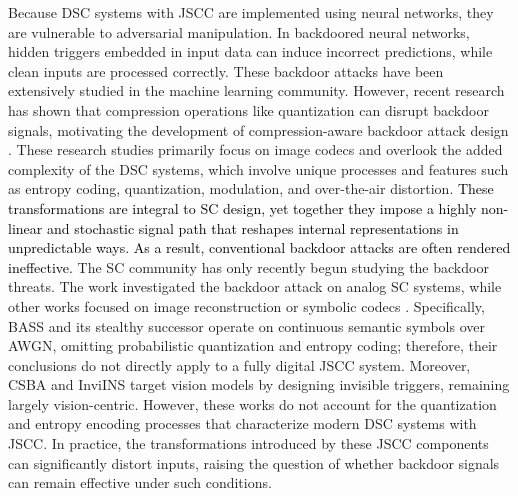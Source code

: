 \documentclass[journal]{IEEEtran}
\begin{document}
Because DSC systems with JSCC are implemented using neural networks, they are vulnerable to adversarial manipulation. 
In backdoored neural networks, hidden triggers embedded in input data can 
induce
incorrect predictions, while clean inputs are processed correctly.
These backdoor attacks have been extensively studied in the machine learning community. However, recent research has shown that compression operations like quantization can disrupt backdoor signals, motivating the development of compression-aware backdoor attack design \cite{DuanAAAIJPEG,twostageattackcompress}. These research studies
primarily focus on image codecs and overlook the added complexity of
 the DSC systems, which involve unique processes and features such as entropy coding, quantization, modulation, and over-the-air distortion.
\textcolor{black}{These transformations are integral to SC design, yet together they impose a highly non-linear and stochastic signal path that reshapes internal representations in unpredictable ways. As a result, conventional backdoor attacks are often rendered ineffective.}
The SC community has only recently begun studying the backdoor threats. The work \cite{Sagduyu2023} investigated the backdoor attack on analog SC systems, while other works focused on image reconstruction or symbolic codecs  \cite{Zhou2024a, Zhou2024b, Xu_good_backdoor_2024, invisible}. Specifically, BASS \cite{Zhou2024a} and its stealthy successor \cite{Zhou2024b} operate on continuous semantic symbols over AWGN, omitting probabilistic quantization and entropy coding; therefore, their conclusions do not directly apply to a fully digital JSCC system. {Moreover, CSBA \cite{Xu_good_backdoor_2024} and InviINS \cite{invisible} target vision models by designing invisible triggers, remaining largely vision-centric. However, these works do not account for the quantization and entropy encoding processes that characterize modern DSC systems with JSCC. In practice, the transformations introduced by these JSCC components can significantly distort inputs, raising the question of whether backdoor signals can remain effective under such conditions.}

\end{document}
